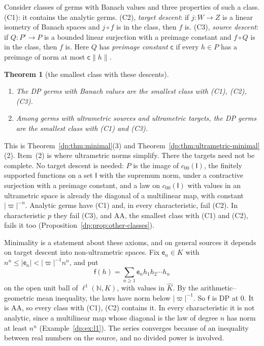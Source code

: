 \documentclass[11pt]{amsart}
\theoremstyle{definition}
\theoremstyle{remark}
\numberwithin{equation}{section}
\newcommand{\N}{\mathbb N}
\newcommand{\abs}[1]{\lvert #1\rvert}
\newcommand{\norm}[1]{\lVert #1\rVert}
\newcommand{\Kh}{\widehat K}
\theoremstyle{plain}
\newtheorem{introtheorem}{Theorem}
\theoremstyle{definition}
\theoremstyle{plain}
\begin{document}
Consider classes of germs with Banach values and three properties of such a class. (C1): it contains the analytic germs. (C2), \emph{target descent}: if $j\colon W\to Z$ is a linear isometry of Banach spaces and $j\circ f$ is in the class, then $f$ is. (C3), \emph{source descent}: if $Q\colon P'\to P$ is a bounded linear surjection with a preimage constant and $f\circ Q$ is in the class, then $f$ is. Here $Q$ has \emph{preimage constant} $\mathsf c$ if every $h\in P$ has a preimage of norm at most $\mathsf c\norm h$.

\begin{introtheorem}[the smallest class with these descents]\label{dp:intro:B}
\leavevmode
\begin{enumerate}
\item The DP germs with Banach values are the smallest class with \textup{(C1), (C2), (C3)}.
\item Among germs with ultrametric sources and ultrametric targets, the DP germs are the smallest class with \textup{(C1)} and \textup{(C3)}.
\end{enumerate}
\end{introtheorem}

This is Theorem~\ref{dp:thm:minimal}(3) and Theorem~\ref{dp:thm:ultrametric-minimal}(2). Item~(2) is where ultrametric norms simplify. There the targets need not be complete. No target descent is needed: $P$ is the image of $c_{00}(\mathsf I)$, the finitely supported functions on a set $\mathsf I$ with the supremum norm, under a contractive surjection with a preimage constant, and a law on $c_{00}(\mathsf I)$ with values in an ultrametric space is already the diagonal of a multilinear map, with constant $\abs\varpi^{-n}$. Analytic germs have (C1) and, in every characteristic, fail (C2). In characteristic $p$ they fail (C3), and AA, the smallest class with (C1) and (C2), fails it too (Proposition~\ref{dp:prop:other-classes}).

Minimality is a statement about these axioms, and on general sources it depends on target descent into non-ultrametric spaces. Fix $\mathsf e_n\in K$ with $n^n\le\abs{\mathsf e_n}<\abs\varpi^{-1}n^n$, and put
\[
 \mathsf f(h)=\sum_{n\ge1}\mathsf e_nh_1h_2\cdots h_n
\]
on the open unit ball of $\ell^1(\N,K)$, with values in $\Kh$. By the arithmetic--geometric mean inequality, the laws have norm below $\abs\varpi^{-1}$. So $\mathsf f$ is DP at $0$. It is AA, so every class with (C1), (C2) contains it. In every characteristic it is not analytic, since a multilinear map whose diagonal is the law of degree $n$ has norm at least $n^n$ (Example~\ref{dp:ex:l1}). The series converges because of an inequality between real numbers on the source, and no divided power is involved.
\end{document}
